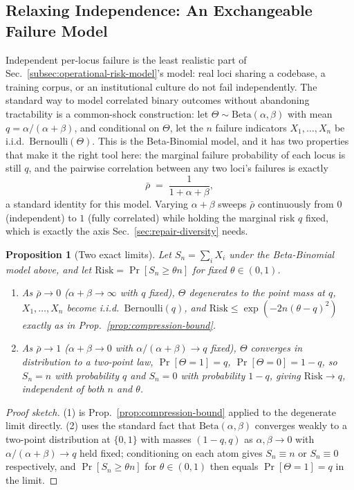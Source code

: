 \documentclass[11pt,a4paper]{article}
\theoremstyle{plain}
\newtheorem{proposition}[theorem]{Proposition}
\theoremstyle{definition}
\theoremstyle{remark}
\begin{document}
\subsection{Relaxing Independence: An Exchangeable Failure Model}
\label{subsec:exchangeable-model}

Independent per-locus failure is the least realistic part of Sec.~\ref{subsec:operational-risk-model}'s model: real loci sharing a codebase, a training corpus, or an institutional culture do not fail independently. The standard way to model correlated binary outcomes without abandoning tractability is a common-shock construction: let $\Theta \sim \mathrm{Beta}(\alpha,\beta)$ with mean $q = \alpha/(\alpha+\beta)$, and conditional on $\Theta$, let the $n$ failure indicators $X_1,\ldots,X_n$ be i.i.d.\ $\mathrm{Bernoulli}(\Theta)$. This is the Beta-Binomial model, and it has two properties that make it the right tool here: the marginal failure probability of each locus is still $q$, and the pairwise correlation between any two loci's failures is exactly
\[
\bar\rho \;=\; \frac{1}{1+\alpha+\beta},
\]
a standard identity for this model. Varying $\alpha+\beta$ sweeps $\bar\rho$ continuously from $0$ (independent) to $1$ (fully correlated) while holding the marginal risk $q$ fixed, which is exactly the axis Sec.~\ref{sec:repair-diversity} needs.

\begin{proposition}[Two exact limits]
\label{prop:two-limits}
Let $S_n = \sum_i X_i$ under the Beta-Binomial model above, and let $\mathrm{Risk} = \Pr[S_n \ge \theta n]$ for fixed $\theta \in (0,1)$.
\begin{enumerate}
  \item As $\bar\rho \to 0$ ($\alpha+\beta\to\infty$ with $q$ fixed), $\Theta$ degenerates to the point mass at $q$, $X_1,\ldots,X_n$ become i.i.d.\ $\mathrm{Bernoulli}(q)$, and $\mathrm{Risk} \le \exp(-2n(\theta-q)^2)$ exactly as in Prop.~\ref{prop:compression-bound}.
  \item As $\bar\rho \to 1$ ($\alpha+\beta \to 0$ with $\alpha/(\alpha+\beta)\to q$ fixed), $\Theta$ converges in distribution to a two-point law, $\Pr[\Theta=1]=q$, $\Pr[\Theta=0]=1-q$, so $S_n = n$ with probability $q$ and $S_n=0$ with probability $1-q$, giving $\mathrm{Risk} \to q$, independent of both $n$ and $\theta$.
\end{enumerate}
\end{proposition}

\begin{proof}[Proof sketch]
(1) is Prop.~\ref{prop:compression-bound} applied to the degenerate limit directly. (2) uses the standard fact that $\mathrm{Beta}(\alpha,\beta)$ converges weakly to a two-point distribution at $\{0,1\}$ with masses $(1-q,q)$ as $\alpha,\beta\to0$ with $\alpha/(\alpha+\beta)\to q$ held fixed; conditioning on each atom gives $S_n\equiv n$ or $S_n\equiv0$ respectively, and $\Pr[S_n\ge\theta n]$ for $\theta\in(0,1)$ then equals $\Pr[\Theta=1]=q$ in the limit.
\end{proof}
\end{document}
